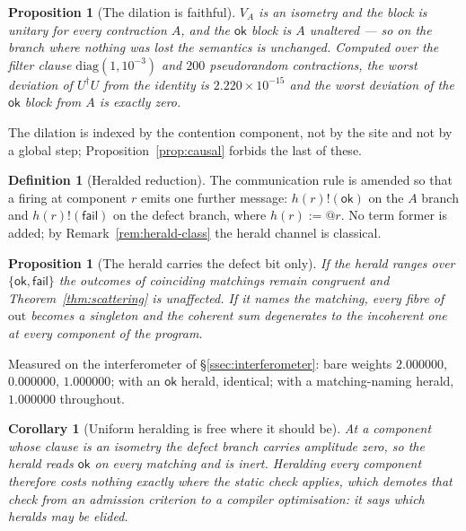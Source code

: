 \documentclass[11pt,a4paper]{article}
\theoremstyle{plain}
\newtheorem{proposition}[theorem]{Proposition}
\newtheorem{corollary}[theorem]{Corollary}
\theoremstyle{definition}
\newtheorem{definition}[theorem]{Definition}
\theoremstyle{remark}
\newcommand{\Out}{\mathrm{out}}
\begin{document}
\begin{proposition}[The dilation is faithful]\label{prop:dilation}
$V_A$ is an isometry and the block is unitary for every contraction $A$, and the
$\mathsf{ok}$ block is $A$ unaltered --- so on the branch where nothing was lost
the semantics is unchanged. Computed over the filter clause
$\mathrm{diag}(1,10^{-3})$ and $200$ pseudorandom contractions, the worst
deviation of $U^{\dagger}U$ from the identity is $2.220\times10^{-15}$ and the
worst deviation of the $\mathsf{ok}$ block from $A$ is exactly zero.
\end{proposition}

The dilation is indexed by the contention component, not by the site and not by
a global step; Proposition~\ref{prop:causal} forbids the last of these.

\begin{definition}[Heralded reduction]\label{def:heraldedred}
The communication rule is amended so that a firing at component $r$ emits one
further message: $h(r)!(\mathsf{ok})$ on the $A$ branch and
$h(r)!(\mathsf{fail})$ on the defect branch, where $h(r) := @r$. No term former
is added; by Remark~\ref{rem:herald-class} the herald channel is classical.
\end{definition}

\begin{proposition}[The herald carries the defect bit only]\label{prop:defectbit}
If the herald ranges over $\{\mathsf{ok},\mathsf{fail}\}$ the outcomes of
coinciding matchings remain congruent and Theorem~\ref{thm:scattering} is
unaffected. If it names the matching, every fibre of $\Out$ becomes a singleton
and the coherent sum degenerates to the incoherent one at every component of the
program.
\end{proposition}

Measured on the interferometer of \S\ref{ssec:interferometer}: bare weights
$2.000000$, $0.000000$, $1.000000$; with an $\mathsf{ok}$ herald, identical;
with a matching-naming herald, $1.000000$ throughout.

\begin{corollary}[Uniform heralding is free where it should be]\label{cor:inert}
At a component whose clause is an isometry the defect branch carries amplitude
zero, so the herald reads $\mathsf{ok}$ on every matching and is inert. Heralding
every component therefore costs nothing exactly where the static check applies,
which demotes that check from an admission criterion to a compiler optimisation:
it says which heralds may be elided.
\end{corollary}
\end{document}
